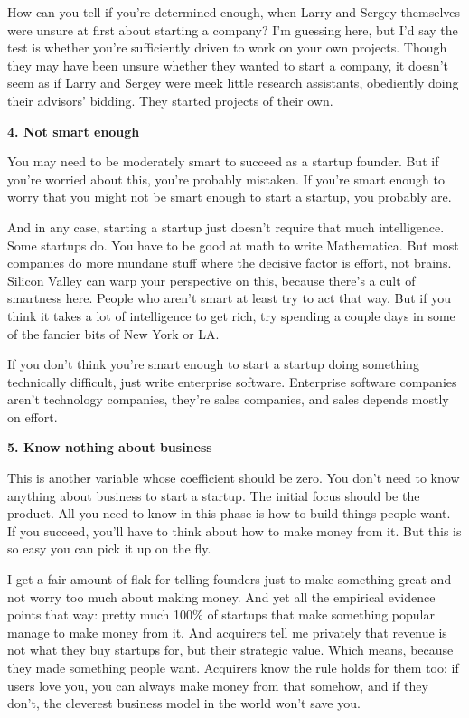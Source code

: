 \documentclass[12pt]{book}
\begin{document}
How can you tell if you're determined enough, when Larry and Sergey
themselves were unsure at first about starting a company? I'm guessing
here, but I'd say the test is whether you're sufficiently driven to work
on your own projects. Though they may have been unsure whether they
wanted to start a company, it doesn't seem as if Larry and Sergey were
meek little research assistants, obediently doing their advisors'
bidding. They started projects of their own.

\textbf{4. Not smart enough}

You may need to be moderately smart to succeed as a startup founder. But
if you're worried about this, you're probably mistaken. If you're smart
enough to worry that you might not be smart enough to start a startup,
you probably are.

And in any case, starting a startup just doesn't require that much
intelligence. Some startups do. You have to be good at math to write
Mathematica. But most companies do more mundane stuff where the decisive
factor is effort, not brains. Silicon Valley can warp your perspective
on this, because there's a cult of smartness here. People who aren't
smart at least try to act that way. But if you think it takes a lot of
intelligence to get rich, try spending a couple days in some of the
fancier bits of New York or LA.

If you don't think you're smart enough to start a startup doing
something technically difficult, just write enterprise software.
Enterprise software companies aren't technology companies, they're sales
companies, and sales depends mostly on effort.

\textbf{5. Know nothing about business}

This is another variable whose coefficient should be zero. You don't
need to know anything about business to start a startup. The initial
focus should be the product. All you need to know in this phase is how
to build things people want. If you succeed, you'll have to think about
how to make money from it. But this is so easy you can pick it up on the
fly.

I get a fair amount of flak for telling founders just to make something
great and not worry too much about making money. And yet all the
empirical evidence points that way: pretty much 100\% of startups that
make something popular manage to make money from it. And acquirers tell
me privately that revenue is not what they buy startups for, but their
strategic value. Which means, because they made something people want.
Acquirers know the rule holds for them too: if users love you, you can
always make money from that somehow, and if they don't, the cleverest
business model in the world won't save you.
\end{document}
